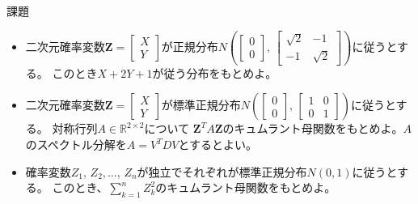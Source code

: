 \documentclass[lualatex,handout]{beamer}
\theoremstyle{definition}
\begin{document}
\begin{frame}{課題}
\begin{itemize}
\setlength{\itemsep}{2em}
\item 二次元確率変数$\symbf{Z}=\begin{bmatrix}X\\Y\end{bmatrix}$が正規分布$N\left(\begin{bmatrix}0\\0\end{bmatrix},\,\begin{bmatrix}\sqrt{2}&-1\\-1&\sqrt{2}\end{bmatrix}\right)$に従うとする。
このとき$X+2Y+1$が従う分布をもとめよ。
\item 二次元確率変数$\symbf{Z}=\begin{bmatrix}X\\Y\end{bmatrix}$が標準正規分布$N\left(\begin{bmatrix}0\\0\end{bmatrix},\,\begin{bmatrix}1&0\\0&1\end{bmatrix}\right)$に従うとする。
対称行列$A\in\mathbb{R}^{2\times 2}$について $\symbf{Z}^TA\symbf{Z}$のキュムラント母関数をもとめよ。$A$のスペクトル分解を$A=V^TDV$とするとよい。
\item 確率変数$Z_1,\,Z_2,\dotsc,\,Z_n$が独立でそれぞれが標準正規分布$N(0,1)$に従うとする。
このとき、$\sum_{k=1}^nZ_k^2$のキュムラント母関数をもとめよ。
\end{itemize}
\end{frame}
\end{document}
